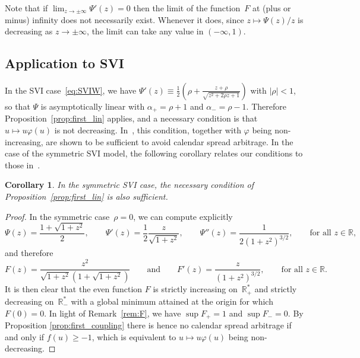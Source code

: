 \documentclass{amsart}[11pt]
\numberwithin{equation}{section}
\newtheorem{corollary}[theorem]{Corollary}
\theoremstyle{definition}
\newcommand{\RR}{\mathbb{R}}
\begin{document}
Note that if $\lim_{z\rightarrow \pm \infty} \Psi'(z) = 0$ then 
the limit of the function~$F$ at (plus or minus) infinity does not necessarily exist.
Whenever it does, since $z \mapsto \Psi(z)/z$ is decreasing as $z \rightarrow \pm\infty$, 
the limit can take any value in $(-\infty,1)$.



\subsection{Application to SVI}\label{sec:CalendarSVI}
In the SVI case~\eqref{eq:SVIW}, we have $\Psi'(z)\equiv\frac{1}{2}\left(\rho+\frac{z+\rho}{\sqrt{z^2+2\rho z+1}}\right)$ with $|\rho| < 1$,
so that $\Psi$ is asymptotically linear with $\alpha_+=\rho+1$ and $\alpha_-=\rho-1$.
Therefore Proposition~\ref{prop:first_lin} applies, 
and a necessary condition is that $u \mapsto u \varphi(u)$ is not decreasing.
In~\cite[Theorem 4.1]{gj}, this condition, together with $\varphi$ being non-increasing, are shown to be sufficient
to avoid calendar spread arbitrage.
In the case of the symmetric SVI model, the following corollary relates our conditions to those in~\cite{gj}.
\begin{corollary}
In the symmetric SVI case, the necessary condition of Proposition~\ref{prop:first_lin} is also sufficient.
\end{corollary}
\begin{proof}
In the symmetric case~$\rho=0$, we can compute explicitly
\begin{equation} \label{sym_dev}
\Psi(z) = \frac{1+\sqrt{1+z^2}}{2},\qquad
\Psi'(z) = \frac{1}{2}\frac{z}{\sqrt{1+z^2}}, \qquad
\Psi''(z) = \frac{1}{2(1+z^2)^{3/2}},
\qquad\text{for all }z\in\RR,
\end{equation}
and therefore 
$$
F(z)=\frac{z^2}{\sqrt{1+z^2}\left(1+\sqrt{1+z^2}\right)}
\qquad\text{and}\qquad
F'(z) = \frac{z}{(1+z^2)^{3/2}},
\qquad\text{for all }z\in\RR.
$$
It is then clear that the even function $F$ is strictly increasing on~$\RR_+^*$ 
and strictly decreasing on~$\RR_-^*$
with a global minimum attained at the origin for which $F(0)=0$.
In light of Remark~\ref{rem:F}, we have $\sup{F_+}=1$ and $\sup{F_-}=0$.
By Proposition \ref{prop:first_coupling} there is hence no calendar spread arbitrage if and only if $f(u)\geq-1$, which is equivalent to 
$u \mapsto u \varphi(u)$ being non-decreasing. 
\end{proof}
\end{document}
